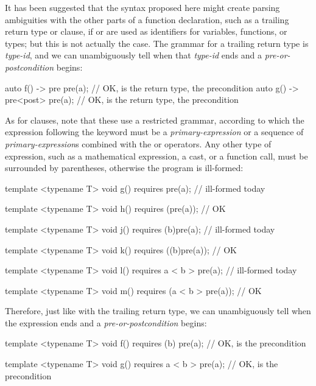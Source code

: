 It has been suggested that the syntax proposed here might create parsing ambiguities with the other parts of a function declaration, such as a trailing return type or  clause, if  or  are used as identifiers for variables, functions, or types; but this is not actually the case. The grammar for a trailing return type is \tcode{->} \emph{type-id}, and we can unambiguously tell when that \emph{type-id} ends and a \emph{pre-or-postcondition} begins:

\begin{codeblock}
auto f() -> pre pre(a);   // OK,  is the return type,  the precondition
auto g() -> pre<post> pre(a);  // OK,  is the return type,  the precondition
\end{codeblock}

As for  clauses, note that these use a restricted grammar, according to which the expression following the  keyword must be a \emph{primary-expression} or a sequence of \emph{primary-expression}s combined with the \tcode{\&\&} or \tcode{||} operators. Any other type of expression, such as a mathematical expression, a cast, or a function call, must be surrounded by parentheses, otherwise the program is ill-formed:

\begin{codeblock}
template <typename T>
void g() requires pre(a);   // ill-formed today

template <typename T>
void h() requires (pre(a));   // OK

template <typename T>
void j() requires (b)pre(a);   // ill-formed today

template <typename T>
void k() requires ((b)pre(a));   // OK

template <typename T>
void l() requires a < b > pre(a);   // ill-formed today

template <typename T>
void m() requires (a < b > pre(a));   // OK

\end{codeblock}

Therefore, just like with the trailing return type, we can unambiguously tell when the expression ends and a \emph{pre-or-postcondition} begins:

\begin{codeblock}
template <typename T>
void f() requires (b) pre(a);   // OK,  is the precondition

template <typename T>
void g() requires a < b > pre(a);   // OK,  is the precondition
\end{codeblock}

